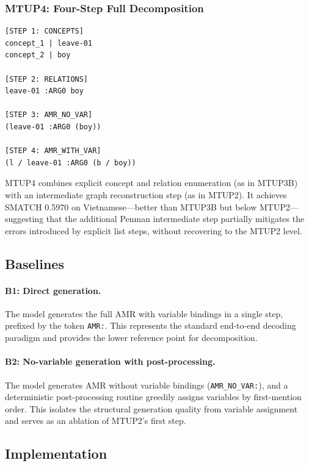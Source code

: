 \subsubsection{MTUP4: Four-Step Full Decomposition}

\begin{lstlisting}[style=amrstyle, basicstyle=\scriptsize\ttfamily]
[STEP 1: CONCEPTS]
concept_1 | leave-01
concept_2 | boy

[STEP 2: RELATIONS]
leave-01 :ARG0 boy

[STEP 3: AMR_NO_VAR]
(leave-01 :ARG0 (boy))

[STEP 4: AMR_WITH_VAR]
(l / leave-01 :ARG0 (b / boy))
\end{lstlisting}

MTUP4 combines explicit concept and relation enumeration (as in MTUP3B) with
an intermediate graph reconstruction step (as in MTUP2). It achieves SMATCH
0.5970 on Vietnamese---better than MTUP3B but below MTUP2---suggesting that
the additional Penman intermediate step partially mitigates the errors
introduced by explicit list steps, without recovering to the MTUP2 level.

\subsection{Baselines}
\label{sec:baselines}

\paragraph{B1: Direct generation.}
The model generates the full AMR with variable bindings in a single step,
prefixed by the token \texttt{AMR:}. This represents the standard end-to-end
decoding paradigm and provides the lower reference point for decomposition.

\paragraph{B2: No-variable generation with post-processing.}
The model generates AMR without variable bindings (\texttt{AMR\_NO\_VAR:}),
and a deterministic post-processing routine greedily assigns variables by
first-mention order. This isolates the structural generation quality from
variable assignment and serves as an ablation of MTUP2's first step.

\subsection{Implementation}
\label{sec:implementation}


